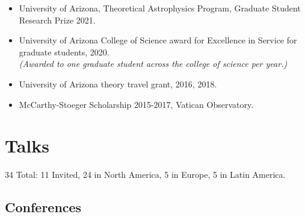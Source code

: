 \documentclass[UTF8]{article}
\begin{document}
\begin{itemize}
  \setlength\itemsep{0.0em}
  \renewcommand\labelitemi{$\cdot$}

\item University of Arizona, Theoretical Astrophysics Program, Graduate Student
Research Prize 2021.
\item University of Arizona College of Science award for Excellence in
Service for graduate students, 2020.\\ 
\indent \textit{(Awarded to one graduate student across the college of
science per year.)}
\item University of Arizona theory travel grant, 2016, 2018. 
\item McCarthy-Stoeger Scholarship 2015-2017, Vatican Observatory.
\end{itemize}
\section*{Talks}

34 Total: 11 Invited, 24 in North America, 5 in Europe, 5 in Latin America.\\


\subsection*{Conferences}
\end{document}
